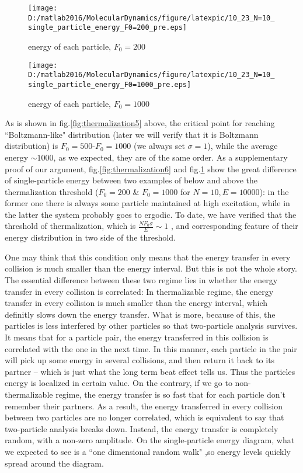 \documentclass[aps,pre,twocolumn,groupedaddress]{revtex4-1}
\begin{document}
\begin{figure}
\texttt{[image: D:/matlab2016/MolecularDynamics/figure/latexpic/10\_23\_N=10\_single\_particle\_energy\_F0=200\_pre.eps]} 
\caption{energy of each particle, $F_0=200$}
\label{fig:thermalization6}

\texttt{[image: D:/matlab2016/MolecularDynamics/figure/latexpic/10\_23\_N=10\_single\_particle\_energy\_F0=1000\_pre.eps]} 
\caption{energy of each particle, $F_0=1000$}
\label{fig:thermalization7}
\end{figure}

As is shown in fig.\ref{fig:thermalization5} above, the critical point for reaching ``Boltzmann-like" distribution (later we will verify that it is Boltzmann distribution) is $F_0=500$-$F_0=1000$ (we always set $\sigma=1$), while the average energy $\sim 1000$, as we expected, they are of the same order. As a supplementary proof of our argument, fig.\ref{fig:thermalization6} and fig.\ref{fig:thermalization7} show the great difference of single-particle energy between two examples of below and above the thermalization threshold ($F_0=200$ $\&$ $F_0=1000$ for $N=10, E=10000$): in the former one there is always some particle maintained at high excitation, while in the latter the system probably goes to ergodic. To date, we have verified that the threshold of thermalization, which is $\frac{NF_0\sigma}{E}\sim1 $ , and corresponding feature of their energy distribution in two side of the threshold.

One may think that this condition only means that the energy transfer in every collision is much smaller than the energy interval. But this is not the whole story. The essential difference between these two regime lies in whether the energy transfer in every collision is correlated: In thermalizable regime, the energy transfer in every collision is much smaller than the energy interval, which definitly slows down the energy transfer. What is more, because of this, the particles is less interfered by other particles so that two-particle analysis survives. It means that for a particle pair, the energy transferred in this collision is correlated with the one in the next time. In this manner, each particle in the pair will pick up some energy in several collisions, and then return it back to its partner -- which is just what the long term beat effect tells us. Thus the particles energy is localized in certain value. On the contrary, if we go to non-thermalizable regime, the energy transfer is so fast that for each particle don't remember their partners. As a result, the energy transferred in every collision between two particles are no longer correlated, which is equivalent to say that two-particle analysis breaks down. Instead, the energy transfer is completely random, with a non-zero amplitude. On the single-particle energy diagram, what we expected to see is a ``one dimensional random walk" ,so energy levels quickly spread around the diagram.
\end{document}
